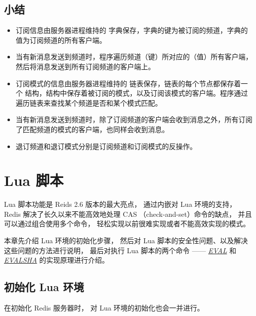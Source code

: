 \documentclass[a4paper,11pt,english]{sphinxmanual}
\begin{document}
\subsection{小结}
\label{feature/pubsub:id10}\begin{itemize}
\item {} 
订阅信息由服务器进程维持的  字典保存，字典的键为被订阅的频道，字典的值为订阅频道的所有客户端。

\item {} 
当有新消息发送到频道时，程序遍历频道（键）所对应的（值）所有客户端，然后将消息发送到所有订阅频道的客户端上。

\item {} 
订阅模式的信息由服务器进程维持的  链表保存，链表的每个节点都保存着一个  结构，结构中保存着被订阅的模式，以及订阅该模式的客户端。程序通过遍历链表来查找某个频道是否和某个模式匹配。

\item {} 
当有新消息发送到频道时，除了订阅频道的客户端会收到消息之外，所有订阅了匹配频道的模式的客户端，也同样会收到消息。

\item {} 
退订频道和退订模式分别是订阅频道和订阅模式的反操作。

\end{itemize}


\section{Lua 脚本}
\label{feature/scripting:lua}\label{feature/scripting::doc}
Lua 脚本功能是 Reids 2.6 版本的最大亮点，
通过内嵌对 Lua 环境的支持，
Redis 解决了长久以来不能高效地处理 CAS （check-and-set）命令的缺点，
并且可以通过组合使用多个命令，
轻松实现以前很难实现或者不能高效实现的模式。

本章先介绍 Lua 环境的初始化步骤，
然后对 Lua 脚本的安全性问题、以及解决这些问题的方法进行说明，
最后对执行 Lua 脚本的两个命令 —— \href{http://redis.readthedocs.org/en/latest/script/eval.html\#eval}{\emph{EVAL}} 和 \href{http://redis.readthedocs.org/en/latest/script/evalsha.html\#evalsha}{\emph{EVALSHA}} 的实现原理进行介绍。


\subsection{初始化 Lua 环境}
\label{feature/scripting:id1}
在初始化 Redis 服务器时，
对 Lua 环境的初始化也会一并进行。
\end{document}
